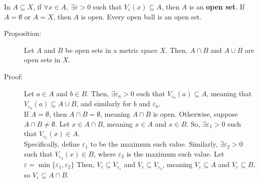\documentclass[12pt]{extarticle}
\begin{document}
  In $A\subseteq X$, if $\forall x\in A,~\exists \varepsilon > 0$ such that $V_{\varepsilon}(x)\subseteq A$, then $A$ is an \textbf{open set}. If $A = \emptyset$ or $A = X$, then $A$ is open. Every open ball is an open set.
  \begin{description}
    \item[Proposition:] Let $A$ and $B$ be open sets in a metric space $X$. Then, $A\cap B$ and $A\cup B$ are open sets in $X$.
    \item[Proof:] Let $a\in A$ and $b\in B$. Then, $\exists \varepsilon_a>0$ such that $V_{\varepsilon_a}(a)\subseteq A$, meaning that $V_{\varepsilon_a}(a)\subseteq A\cup B$, and similarly for $b$ and $\varepsilon_b$.\\

    If $A = \emptyset$, then $A\cap B = \emptyset$, meaning $A\cap B$ is open. Otherwise, suppose $A\cap B \neq \emptyset$. Let $x\in A\cap B$, meaning $x\in A$ and $x\in B$. So, $\exists \varepsilon_1>0$ such that $V_{\varepsilon_1}(x)\in A$.\\

    Specifically, define $\varepsilon_1$ to be the maximum such value. Similarly, $\exists \varepsilon_2 > 0$ such that $V_{\varepsilon_2}(x)\in B$, where $\varepsilon_2$ is the maximum such value. Let $\varepsilon = \min\{\varepsilon_1,\varepsilon_2\}$ Then, $V_{\varepsilon} \subseteq V_{\varepsilon_1}$ and $V_{\varepsilon} \subseteq V_{\varepsilon_2}$, meaning $V_{\varepsilon} \subseteq A$ and $V_{\varepsilon}\subseteq B$, so $V_{\varepsilon} \subseteq A\cap B$.
  \end{description}
\end{document}

